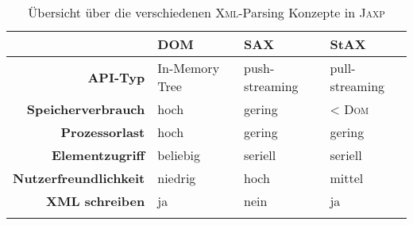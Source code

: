 \begin{table}[hb]
    \begin{longtable}[c]{r l l l}
        \toprule
        \rowcolor{lightgray}
        & \textbf{DOM}   & \textbf{SAX}   & \textbf{StAX} \\
        \midrule
        \textbf{API-Typ}                    & In-Memory Tree    & push-streaming    & pull-streaming\\
        \textbf{Speicherverbrauch}          & hoch              & gering            & \textless{} \textsc{Dom}\\
        \textbf{Prozessorlast}              & hoch              & gering            & gering \\
        \textbf{Elementzugriff}             & beliebig          & seriell           & seriell \\
        \textbf{Nutzerfreundlichkeit}       & niedrig           & hoch              & mittel \\
        \textbf{XML schreiben}              & ja                & nein              & ja \\
        \bottomrule
        \caption{Übersicht über die verschiedenen \textsc{Xml}-Parsing Konzepte in \textsc{Jaxp}}
        \label{tab:xmlParsingModels}
    \end{longtable}
\end{table}
